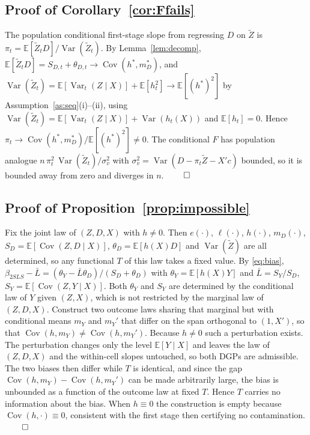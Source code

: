 \documentclass[preprint,11pt,authoryear]{elsarticle}
\theoremstyle{definition}
\newcommand{\E}{\mathbb{E}}
\newcommand{\Cov}{\operatorname{Cov}}
\newcommand{\Var}{\operatorname{Var}}
\newcommand{\Ztil}{\tilde{Z}}
\begin{document}
\subsection*{Proof of Corollary~\ref{cor:Ffails}}
The population conditional first-stage slope from regressing $D$ on $\Ztil$ is
$\pi_t=\E[\Ztil_t D]/\Var(\Ztil_t)$. By Lemma~\ref{lem:decomp},
$\E[\Ztil_t D]=S_{D,t}+\theta_{D,t}\to\Cov(h^\ast,m_D^\ast)$, and
$\Var(\Ztil_t)=\E[\Var_t(Z\mid X)]+\E[h_t^2]\to\E[(h^\ast)^2]$ by Assumption~\ref{as:seq}(i)--(ii),
using $\Var(\Ztil_t)=\E[\Var_t(Z\mid X)]+\Var(h_t(X))$ and $\E[h_t]=0$. Hence
$\pi_t\to\Cov(h^\ast,m_D^\ast)/\E[(h^\ast)^2]\neq0$. The conditional $F$ has population analogue
$n\,\pi_t^2\,\Var(\Ztil_t)/\sigma^2_v$ with $\sigma^2_v=\Var(D-\pi_t\Ztil-X'c)$ bounded, so it is
bounded away from zero and diverges in $n$. \hfill$\qed$

\subsection*{Proof of Proposition~\ref{prop:impossible}}
Fix the joint law of $(Z,D,X)$ with $h\neq0$. Then $e(\cdot)$, $\ell(\cdot)$, $h(\cdot)$,
$m_D(\cdot)$, $S_D=\E[\Cov(Z,D\mid X)]$, $\theta_D=\E[h(X)D]$ and $\Var(\Ztil)$ are all determined, so
any functional $T$ of this law takes a fixed value. By \eqref{eq:bias},
$\beta_{2SLS}-\bar L=(\theta_Y-\bar L\theta_D)/(S_D+\theta_D)$ with $\theta_Y=\E[h(X)Y]$ and
$\bar L=S_Y/S_D$, $S_Y=\E[\Cov(Z,Y\mid X)]$. Both $\theta_Y$ and $S_Y$ are determined by the
conditional law of $Y$ given $(Z,X)$, which is not restricted by the marginal law of $(Z,D,X)$.
Construct two outcome laws sharing that marginal but with conditional means $m_Y$ and $m_Y'$ that
differ on the span orthogonal to $(1,X')$, so that $\Cov(h,m_Y)\neq\Cov(h,m_Y')$. Because $h\neq0$
such a perturbation exists. The perturbation changes only the level $\E[Y\mid X]$ and leaves the law
of $(Z,D,X)$ and the within-cell slopes untouched, so both DGPs are admissible. The two biases then
differ while $T$ is identical, and since the gap $\Cov(h,m_Y)-\Cov(h,m_Y')$ can be made arbitrarily
large, the bias is unbounded as a function of the outcome law at fixed $T$. Hence $T$ carries no
information about the bias. When $h\equiv0$ the construction is empty because $\Cov(h,\cdot)\equiv0$,
consistent with the first stage then certifying no contamination. \hfill$\qed$
\end{document}
